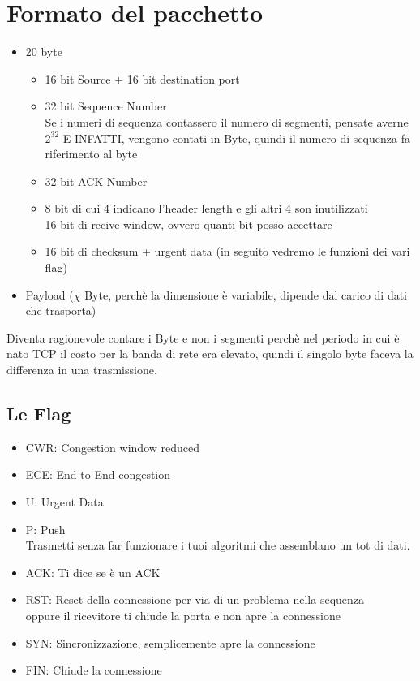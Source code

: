 \documentclass[12pt, a4paper, openany, twoside]{book}
\begin{document}
\section{Formato del pacchetto}
\begin{itemize}
	\item 20 byte
	\begin{itemize}
		\item 16 bit Source + 16 bit destination port
		\item 32 bit Sequence Number\\
		Se i numeri di sequenza contassero il numero di segmenti, pensate averne 
		$2^{32}$ E INFATTI, vengono contati in Byte, quindi il numero di sequenza fa 
		riferimento al byte
		\item 32 bit ACK Number
		\item 8 bit di cui 4 indicano l'header length e gli altri 4 son inutilizzati \\
		16 bit di recive window, ovvero quanti bit posso accettare 
		\item 16 bit di checksum + urgent data (in seguito vedremo le funzioni dei 
		vari flag)
	\end{itemize}
	\item Payload ($\chi$ Byte, perchè la dimensione è variabile, dipende
	dal carico di dati che trasporta)
\end{itemize}
Diventa ragionevole contare i Byte e non i segmenti perchè nel periodo in cui è 
nato TCP il costo per la banda di rete era elevato, quindi il singolo byte 
faceva la differenza in una trasmissione.
\subsection{Le Flag}
\begin{itemize}
	\item CWR: Congestion window reduced
	\item ECE: End to End congestion 
	\item U: Urgent Data
	\item P: Push\\
	Trasmetti senza far funzionare i tuoi algoritmi che assemblano un tot di dati.
	\item ACK: Ti dice se è un ACK
	\item RST: Reset della connessione per via di un problema nella sequenza\\
	oppure il ricevitore ti chiude la porta e non apre la connessione
	\item SYN: Sincronizzazione, semplicemente apre la connessione
	\item FIN: Chiude la connessione
\end{itemize}
\end{document}
